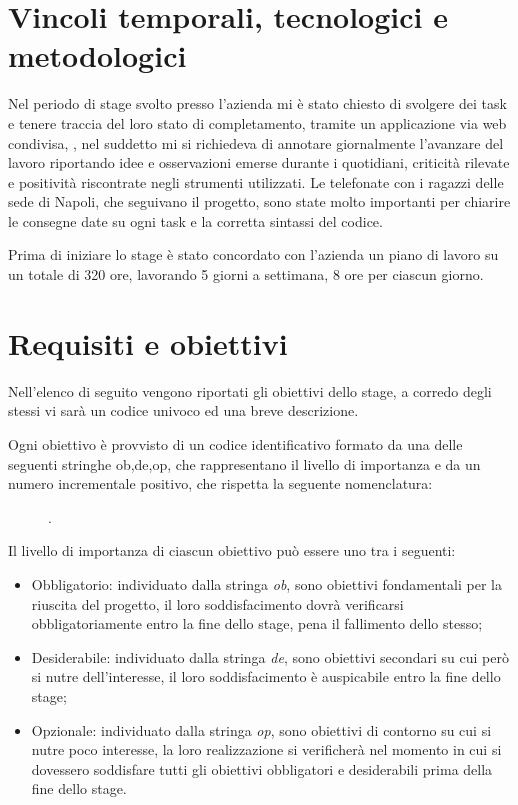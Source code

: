 \section{Vincoli temporali, tecnologici e metodologici}
Nel periodo di stage svolto presso l'azienda mi è stato chiesto di svolgere dei task e tenere traccia del loro stato di completamento, tramite un applicazione via web condivisa, , nel suddetto mi si richiedeva di annotare giornalmente l'avanzare del lavoro riportando idee e osservazioni emerse durante i  quotidiani, criticità rilevate e positività riscontrate negli strumenti utilizzati.
Le telefonate con i ragazzi delle sede di Napoli, che seguivano il progetto, sono state molto importanti per chiarire le consegne date su ogni task e la corretta sintassi del codice.

Prima di iniziare lo stage è stato concordato con l'azienda un piano di lavoro su un totale di 320 ore, lavorando 5 giorni a settimana, 8 ore per ciascun giorno. 

\section{Requisiti e obiettivi}
Nell'elenco di seguito vengono riportati gli obiettivi dello stage, a corredo degli stessi vi sarà un codice univoco ed una breve descrizione.

Ogni obiettivo è provvisto di un codice identificativo formato da una delle seguenti stringhe ob,de,op, che rappresentano il livello di importanza e da un numero incrementale positivo, che rispetta la seguente nomenclatura: 
\begin{figure}[htp]
	\centering
	[importanza][identificativo].
\end{figure}

Il livello di importanza di ciascun obiettivo può essere uno tra i seguenti:
\begin{itemize}
	\item Obbligatorio: individuato dalla stringa \textit{ob}, sono obiettivi fondamentali per la riuscita del progetto, il loro soddisfacimento dovrà verificarsi obbligatoriamente entro la fine dello stage, pena il fallimento dello stesso;
	\item Desiderabile: individuato dalla stringa \textit{de}, sono obiettivi secondari su cui però si nutre dell'interesse, il loro soddisfacimento è auspicabile entro la fine dello stage;
	\item Opzionale: individuato dalla stringa \textit{op}, sono obiettivi di contorno su cui si nutre poco interesse, la loro realizzazione si verificherà nel momento in cui si dovessero soddisfare tutti gli obiettivi obbligatori e desiderabili prima della fine dello stage.
\end{itemize}


